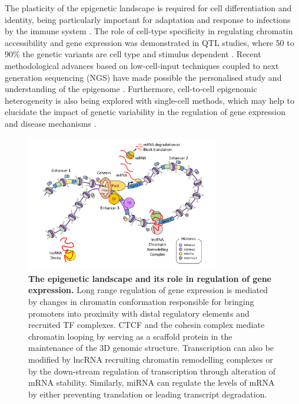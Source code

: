 The plasticity of the epigenetic landscape is required for cell differentiation and identity, being particularly important for adaptation and response to infections by the immune system \parencite{Yosef2016}. The role of cell-type specificity in regulating chromatin accessibility and gene expression was demonstrated in QTL studies, where 50 to 90\% the genetic variants are cell type and stimulus dependent \parencite{Dimas2009,Nica2011,Fairfax2012,Fairfax2014,Raj2014,Naranbhai2015,Kasela2017}. Recent methodological advances based on low-cell-input techniques coupled to next generation sequencing (NGS) have made possible the personalised study and understanding of the epigenome \parencite{Buenrostro2013, Schmidl2015,Oudelaar2017}. Furthermore, cell-to-cell epigenomic heterogeneity is also being explored with single-cell methods, which may help to elucidate the impact of genetic variability in the regulation of gene expression and disease mechanisms \parencite{Buenrostro2015, Cusanovich2015,Rotem2015,Nagano2013,Smallwood2014}.

\begin{figure}[h]
\centering
\includegraphics[width=0.75\textwidth]{./Introduction/pdfs/Epigenetic_regulation_diagram}
\caption[The epigenetic landscape and its role in regulation of gene expression. ]{\textbf{The epigenetic landscape and its role in regulation of gene expression.} Long range regulation of gene expression is mediated by changes in chromatin conformation responsible for bringing promoters into proximity with distal regulatory elements and recruited TF complexes. CTCF and the cohesin complex mediate chromatin looping by serving as a scaffold protein in the maintenance of the 3D genomic structure. Transcription can also be modified by lncRNA recruiting chromatin remodelling complexes or by the down-stream regulation of transcription through alteration of mRNA stability. Similarly, miRNA can regulate the levels of mRNA by either preventing translation or leading transcript degradation.}
\label{figure:Epigenetic_regulation}
\end{figure}

